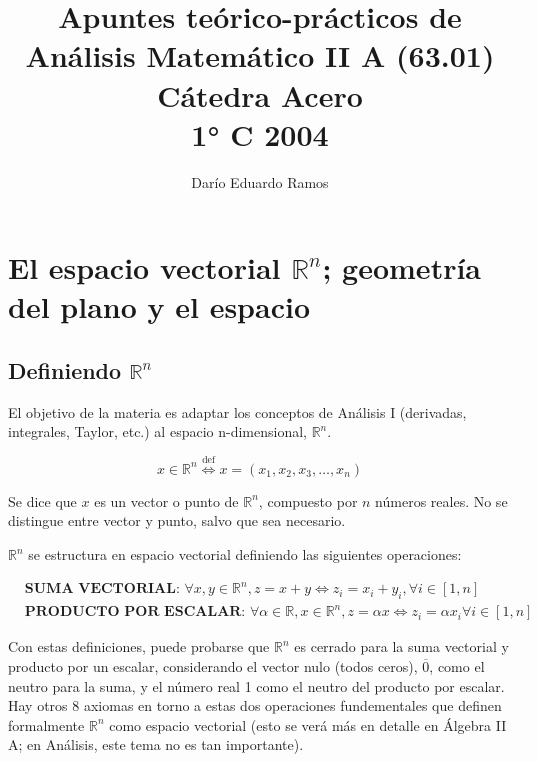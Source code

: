 \documentclass{article}
\title{Apuntes teórico-prácticos de Análisis Matemático II A (63.01) \\ Cátedra Acero \\ 1° C 2004}
\author{Darío Eduardo Ramos}
\renewcommand{\Bbb}{\mathbb}
\begin{document}
\maketitle

\tableofcontents{}
\newpage


\section{El espacio vectorial \texorpdfstring{$\Bbb R^n$}{Rn}; geometría del plano y el espacio}

\subsection{Definiendo \texorpdfstring{$\Bbb R^n$}{Rn}}

El objetivo de la materia es adaptar los conceptos de Análisis I (derivadas, integrales, Taylor, etc.) al espacio n-dimensional, $\mathbb{R}^n$.

\begin{equation}
x \in \Bbb R^n \overset{\text{def}}{\Longleftrightarrow} x = (x_1, x_2, x_3, \ldots, x_n)
\end{equation}

Se dice que $x$ es un vector o punto de $\Bbb R^n$, compuesto por $n$ números reales. No se distingue entre vector y punto, salvo que sea necesario.

$\Bbb R^n$ se estructura en espacio vectorial definiendo las siguientes operaciones:

\begin{subequations}
\begin{align}
& \textbf{SUMA VECTORIAL: } \forall x, y \in \Bbb R^n, z = x + y \Longleftrightarrow z_i = x_i + y_i, \forall i \in [1, n] \\
& \textbf{PRODUCTO POR ESCALAR: } \forall \alpha \in \Bbb R, x \in \Bbb R^n, z = \alpha x \Longleftrightarrow z_i = \alpha x_i \forall i \in [1, n]
\end{align}
\end{subequations}

Con estas definiciones, puede probarse que $\Bbb R^n$ es cerrado para la suma vectorial y producto por un escalar, considerando el vector nulo (todos ceros), $\overline{0}$, como el neutro para la suma, y el número real 1 como el neutro del producto por escalar. Hay otros 8 axiomas en torno a estas dos operaciones fundementales que definen formalmente $\Bbb R^n$ como espacio vectorial (esto se verá más en detalle en Álgebra II A; en Análisis, este tema no es tan importante).
\end{document}
